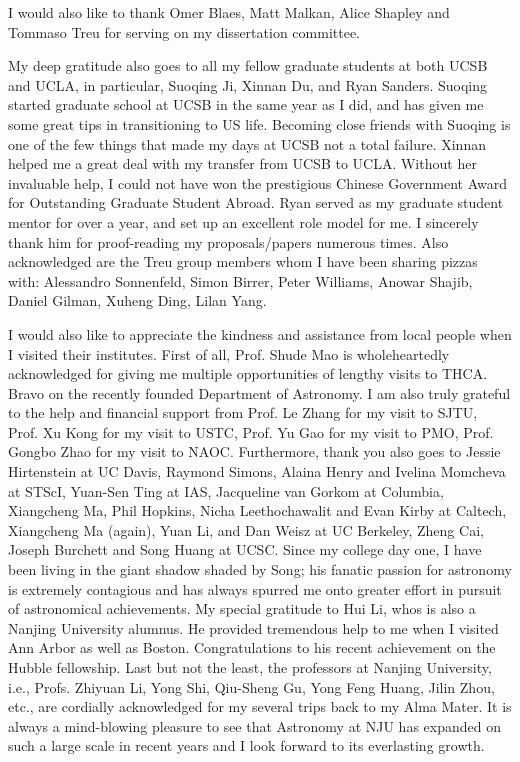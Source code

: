 I would also like to thank Omer Blaes, Matt Malkan, Alice Shapley and Tommaso Treu for serving on my dissertation
committee.

My deep gratitude also goes to all my fellow graduate students at both UCSB and UCLA, in particular, Suoqing Ji,
Xinnan Du, and Ryan Sanders.
Suoqing started graduate school at UCSB in the same year as I did, and has given me some great tips in
transitioning to US life.
Becoming close friends with Suoqing is one of the few things that made my days at UCSB not a total failure.
Xinnan helped me a great deal with my transfer from UCSB to UCLA.
Without her invaluable help, I could not have won the prestigious Chinese Government Award for Outstanding
Graduate Student Abroad.
Ryan served as my graduate student mentor for over a year, and set up an excellent role model for me.
I sincerely thank him for proof-reading my proposals/papers numerous times.
Also acknowledged are the Treu group members whom I have been sharing pizzas with:
Alessandro Sonnenfeld, Simon Birrer, Peter Williams, Anowar Shajib, Daniel Gilman, Xuheng Ding, Lilan Yang.

I would also like to appreciate the kindness and assistance from local people when I visited their institutes.
First of all, Prof. Shude Mao is wholeheartedly acknowledged for giving me multiple opportunities of lengthy visits to THCA.
Bravo on the recently founded Department of Astronomy.
I am also truly grateful to the help and financial support from Prof. Le Zhang for my visit to SJTU, 
Prof. Xu Kong for my visit to USTC, Prof. Yu Gao for my visit to PMO, Prof. Gongbo Zhao for my visit to NAOC.
Furthermore, thank you also goes to Jessie Hirtenstein at UC Davis,
Raymond Simons, Alaina Henry and Ivelina Momcheva at STScI,
Yuan-Sen Ting at IAS,
Jacqueline van Gorkom at Columbia,
Xiangcheng Ma, Phil Hopkins, Nicha Leethochawalit and Evan Kirby at Caltech,
Xiangcheng Ma (again), Yuan Li, and Dan Weisz at UC Berkeley,
Zheng Cai, Joseph Burchett and Song Huang at UCSC.
Since my college day one, I have been living in the giant shadow shaded by Song; 
his fanatic passion for astronomy is extremely contagious and has always spurred me onto greater effort in
pursuit of astronomical achievements.
My special gratitude to Hui Li, whos is also a Nanjing University alumnus.
He provided tremendous help to me when I visited Ann Arbor as well as Boston.
Congratulations to his recent achievement on the Hubble fellowship.
Last but not the least, the professors at Nanjing University, i.e., Profs. Zhiyuan Li, Yong Shi, Qiu-Sheng Gu,
Yong Feng Huang, Jilin Zhou, etc., are cordially acknowledged for my several trips back to my Alma Mater.
It is always a mind-blowing pleasure to see that Astronomy at NJU has expanded on such a large scale in recent
years and I look forward to its everlasting growth.

